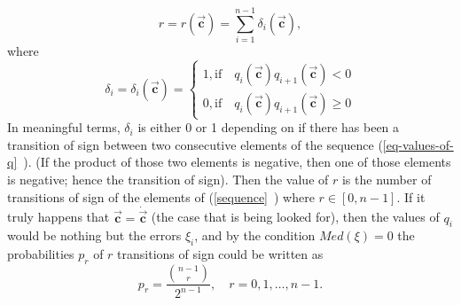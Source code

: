 \documentclass[11pt,a4paper]{article}
\numberwithin{equation}{subsection}
\newcommand{\vecc}{\vec{\textbf{c}}}
\begin{document}
\begin{equation}
r=r(\vecc)=\sum\limits_{i=1}^{n-1} \delta_{i}(\vecc), \label{eq-values-of-q}
\end{equation}
where
\begin{equation}
\delta_{i}=\delta_{i}(\vecc)=
\begin{cases} 
      1, \mathrm{if} \quad q_{i}(\vecc)q_{i+1}(\vecc)<0\\
      0, \mathrm{if} \quad q_{i}(\vecc)q_{i+1}(\vecc)\geq 0
   \end{cases}
\end{equation}
In meaningful terms, $\delta_{i}$ is either 0 or 1 depending on if there has been a transition of sign between two consecutive elements of the sequence (\vref{eq-values-of-q}~). (If the product of those two elements is negative, then one of those elements is negative; hence the transition of sign). Then the value of $r$ is the number of transitions of sign of the elements of  (\vref{sequence}~) where $r \in [0,n-1]$. If it truly happens that $\vecc=\dot{\vecc}$ (the case that is being looked for), then the values of $q_{i}$ would be nothing but the errors $\xi_{i}$, and by the condition $Med(\xi)=0$ the probabilities $p_{r}$ of  $r$ transitions of sign could be written as
\begin{equation}
p_{r}= \frac{\binom {n-1}r}{2^{n-1}}, \quad r = 0,1,\dots,n-1. \label{priori}
\end{equation}
\end{document}
